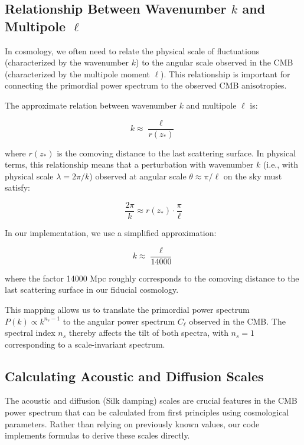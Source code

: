 \documentclass[11pt]{article}
\begin{document}
\subsection{Relationship Between Wavenumber $k$ and Multipole $\ell$}

In cosmology, we often need to relate the physical scale of fluctuations (characterized by the wavenumber $k$) to the angular scale observed in the CMB (characterized by the multipole moment $\ell$). This relationship is important for connecting the primordial power spectrum to the observed CMB anisotropies.

The approximate relation between wavenumber $k$ and multipole $\ell$ is:

\begin{equation}
k \approx \frac{\ell}{r(z_*)}
\end{equation}

where $r(z_*)$ is the comoving distance to the last scattering surface. In physical terms, this relationship means that a perturbation with wavenumber $k$ (i.e., with physical scale $\lambda = 2\pi/k$) observed at angular scale $\theta \approx \pi/\ell$ on the sky must satisfy:

\begin{equation}
\frac{2\pi}{k} \approx r(z_*) \cdot \frac{\pi}{\ell}
\end{equation}

In our implementation, we use a simplified approximation:

\begin{equation}
k \approx \frac{\ell}{14000}
\end{equation}

where the factor 14000 Mpc roughly corresponds to the comoving distance to the last scattering surface in our fiducial cosmology.

This mapping allows us to translate the primordial power spectrum $P(k) \propto k^{n_s-1}$ to the angular power spectrum $C_\ell$ observed in the CMB. The spectral index $n_s$ thereby affects the tilt of both spectra, with $n_s = 1$ corresponding to a scale-invariant spectrum.

\subsection{Calculating Acoustic and Diffusion Scales}

The acoustic and diffusion (Silk damping) scales are crucial features in the CMB power spectrum that can be calculated from first principles using cosmological parameters. Rather than relying on previously known values, our code implements formulas to derive these scales directly.
\end{document}
